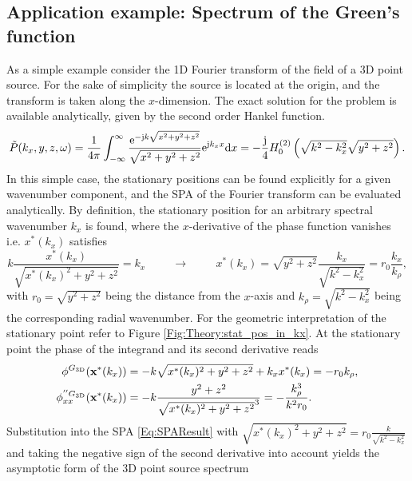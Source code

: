 \subsection*{Application example: Spectrum of the Green's function}
As a simple example consider the 1D Fourier transform of the field of a 3D point source.
For the sake of simplicity the source is located at the origin, and the transform is taken along the $x$-dimension.
The exact solution for the problem is available analytically, given by the second order Hankel function.
\begin{equation}
\tilde{P}(k_x,y,z,\omega) = \frac{1}{4\pi} \int_{-\infty}^{\infty} \frac{\mathrm{e}^{-\mathrm{j} k \sqrt{x^2 + y^2 + z^2}}}{\sqrt{x^2 + y^2 + z^2}} \mathrm{e}^{\mathrm{j} k_x x} \mathrm{d} x = 
-\frac{\mathrm{j}}{4} H_0^{(2)}\left( \sqrt{k^2- k_x^2} \sqrt{y^2 + z^2} \right).
\label{Eq:HF_approx:Greens_spectrum_defintion}
\end{equation}
In this simple case, the stationary positions can be found explicitly for a given wavenumber component, and the SPA of the Fourier transform can be evaluated analytically. 
By definition, the stationary position for an arbitrary spectral wavenumber $k_x$ is found, where the $x$-derivative of the phase function vanishes i.e. $x^*(k_x)$ satisfies
\begin{equation}
k \frac{x^*(k_x)}{\sqrt{x^*(k_x)^2 + y^2 + z^2}} = k_x 
\hspace{1cm} \rightarrow \hspace{1cm} 
x^*(k_x) = \sqrt{y^2 + z^2} \frac{k_x}{\sqrt{k^2 - k_x^2}}  = r_0 \frac{k_x}{k_{\rho}},
\label{eq:HF_approx:greens_spectrum_stat_point}
\end{equation}
with $r_0 = \sqrt{y^2+z^2}$ being the distance from the $x$-axis and $k_{\rho} = \sqrt{k^2-k_x^2}$ being the corresponding radial wavenumber.
For the geometric interpretation of the stationary point refer to Figure \ref{Fig:Theory:stat_pos_in_kx}.
At the stationary point the phase of the integrand and its second derivative reads
\begin{align}
\phi^{G_{3\mathrm{D}}}(\mathbf{x}^*(k_x)) &=  -k \sqrt{x^*(k_x)^2 + y^2 + z^2} + k_x x^*(k_x) = -r_0 k_{\rho},\\
\phi^{''G_{3\mathrm{D}}}_{xx}(\mathbf{x}^*(k_x)) &=  -k \frac{y^2+z^2}{\sqrt{ x^*(k_x)^2 +y^2+z^2 }^3} = - \frac{k_{\rho}^3}{k^2 r_0}.
\end{align}
Substitution into the SPA \eqref{Eq:SPAResult} with $\sqrt{x^*(k_x)^2 + y^2 + z^2} = r_0\frac{k}{\sqrt{k^2 - k_x^2}}$ and taking the negative sign of the second derivative into account yields the asymptotic form of the 3D point source spectrum

